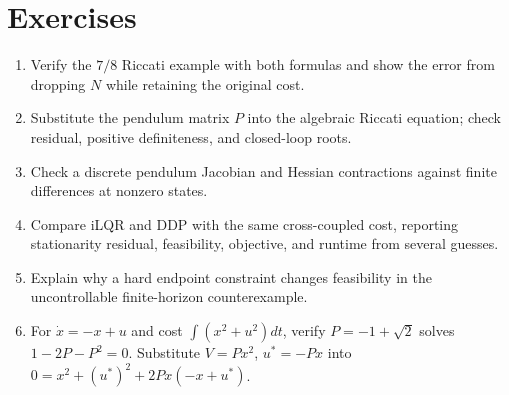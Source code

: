 \section*{Exercises}
\begin{enumerate}
\item Verify the $7/8$ Riccati example with both formulas and show the error
from dropping $N$ while retaining the original cost.
\item Substitute the pendulum matrix $P$ into the algebraic Riccati equation;
check residual, positive definiteness, and closed-loop roots.
\item Check a discrete pendulum Jacobian and Hessian contractions against
finite differences at nonzero states.
\item Compare iLQR and DDP with the same cross-coupled cost, reporting
stationarity residual, feasibility, objective, and runtime from several guesses.
\item Explain why a hard endpoint constraint changes feasibility in the
uncontrollable finite-horizon counterexample.
\item For $\dot x=-x+u$ and cost $\int(x^2+u^2)dt$, verify
$P=-1+\sqrt2$ solves $1-2P-P^2=0$. Substitute $V=Px^2$, $u^*=-Px$
into $0=x^2+(u^*)^2+2Px(-x+u^*)$.
\end{enumerate}
